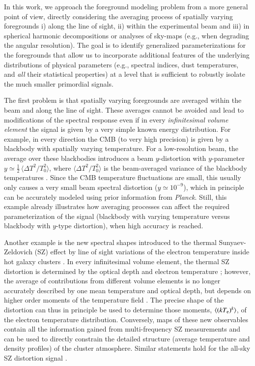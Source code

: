 \documentclass[usenatbib]{mn2e}
\begin{document}
In this work, we approach the foreground modeling problem from a more general point of view, directly considering the averaging process of spatially varying foregrounds i) along the line of sight, ii) within the experimental beam and iii) in spherical harmonic decompositions or analyses of sky-maps (e.g., when degrading the angular resolution). The goal is to identify generalized parameterizations for the foregrounds that allow us to incorporate additional features of the underlying distributions of physical parameters (e.g., spectral indices, dust temperatures, and {\it all} their statistical properties) at a level that is sufficient to robustly isolate the much smaller primordial signals. 


The first problem is that spatially varying foregrounds are averaged within the beam and along the line of sight. These averages cannot be avoided and lead to modifications of the spectral response even if in every {\it infinitesimal volume element} the signal is given by a very simple known energy distribution. For example, in every direction the CMB (to very high precision) is given by a blackbody with spatially varying temperature. For a low-resolution beam, the average over these blackbodies introduces a beam $y$-distortion with $y$-parameter $y\simeq \frac{1}{2}\,\langle\Delta T^2/T^2_0\rangle$, where $\langle\Delta T^2/T^2_0\rangle$ is the beam-averaged variance of the blackbody temperatures \citep{Chluba2004}. Since the CMB temperature fluctuations are small, this usually only causes a very small beam spectral distortion ($y\simeq 10^{-9}$), which in principle can be accurately modeled using prior information from {\it Planck}. Still, this example already illustrates how averaging processes can affect the required parameterization of the signal (blackbody with varying temperature versus blackbody with $y$-type distortion), when high accuracy is reached.

Another example is the new spectral shapes introduced to the thermal Sunyaev-Zeldovich (SZ) effect \citep{Zeldovich1969} by line of sight variations of the electron temperature inside hot galaxy clusters \citep{Chluba2012moments}. In every infinitesimal volume element, the thermal SZ distortion is determined by the optical depth and electron temperature \citep{Sazonov1998, Itoh98}; however, the average of contributions from different volume elements is no longer accurately described by one mean temperature and optical depth, but depends on higher order moments of the temperature field \citep{Chluba2012moments}. The precise shape of the distortion can thus in principle be used to determine those moments, $\langle(kT_{\rm e})^k\rangle$, of the electron temperature distribution. Conversely, maps of these new observables contain all the information gained from multi-frequency SZ measurements and can be used to directly constrain the detailed structure (average temperature and density profiles) of the cluster atmosphere. Similar statements hold for the all-sky SZ distortion signal \citep{Hill2015}.
\end{document}
